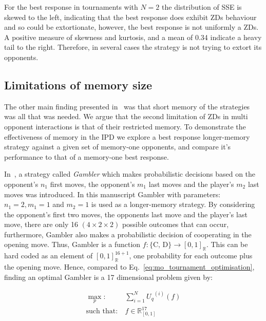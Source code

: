 \documentclass[10pt]{article}
\newcommand{\R}{\mathbb{R}}
\begin{document}
For the best response in tournaments with \(N=2\) the
distribution of SSE is skewed to the left, indicating that the best response
does exhibit ZDs behaviour and so could be extortionate, however, the best
response is not uniformly a ZDs. A positive measure of skewness and kurtosis,
and a mean of 0.34 indicate a heavy tail to the right. Therefore, in several
cases the strategy is not trying to extort its opponents.

\subsection{Limitations of memory size} %

The other main finding presented in~\cite{Press2012} was that
short memory of the strategies was all that was needed.
We argue that the second limitation of ZDs in multi opponent
interactions is that of their restricted memory.
To demonstrate the effectiveness of memory in the IPD we explore a best response
longer-memory strategy against a given set of memory-one opponents,  and compare
it's performance to that of a memory-one best response.

In~\cite{Harper2017}, a strategy called \textit{Gambler} which makes
probabilistic decisions based on the opponent's \(n_1\) first moves, the
opponent's \(m_1\) last moves and the player's \(m_2\) last moves was
introduced. In this manuscript Gambler with parameters: $n_1 = 2, m_1 = 1$ and $m_2 = 1$ is used
as a longer-memory strategy.
By considering the opponent's first two moves, the opponents last move and the
player's last move, there are only 16 $(4 \times 2 \times 2)$ possible outcomes
that can occur, furthermore, Gambler also makes a probabilistic decision of
cooperating in the opening move. Thus, Gambler is a function \(f: \{\text{C,
D}\} \rightarrow [0, 1]_{\R}\). This can be hard coded as an element
of \([0, 1]_{\R} ^ {16 + 1}\), one probability for each outcome plus the opening
move. Hence, compared to Eq.~\ref{eq:mo_tournament_optimisation}, finding an
optimal Gambler is a 17 dimensional problem given by:

\begin{equation}\label{eq:gambler_optimisation}
    \begin{aligned}
    \max_p: & \ \sum_{i=1} ^ {N} {U_q}^{(i)} (f)
    \\
    \text{such that}: & \ f \in \R_{[0, 1]}^{17}
    \end{aligned}
\end{equation}
\end{document}
